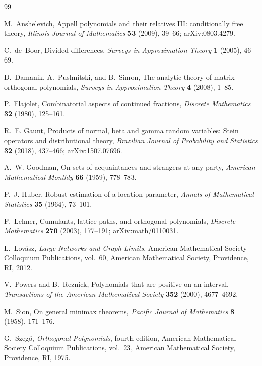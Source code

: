 ﻿\documentclass[11pt]{article}
\numberwithin{equation}{section}
\begin{document}
\begin{thebibliography}{99}

   M.~Anshelevich, \newblock Appell polynomials and their relatives III: conditionally free theory, \newblock \emph{Illinois Journal of Mathematics} \textbf{53} (2009), 39--66; \newblock arXiv:0803.4279.

   C.~de~Boor, \newblock Divided differences, \newblock \emph{Surveys in Approximation Theory} \textbf{1} (2005), 46--69.

   D.~Damanik, A.~Pushnitski, and B.~Simon, \newblock The analytic theory of matrix orthogonal polynomials, \newblock \emph{Surveys in Approximation Theory} \textbf{4} (2008), 1--85.

   P.~Flajolet, \newblock Combinatorial aspects of continued fractions, \newblock \emph{Discrete Mathematics} \textbf{32} (1980), 125--161.

   R.~E. Gaunt, \newblock Products of normal, beta and gamma random variables: Stein operators and distributional theory, \newblock \emph{Brazilian Journal of Probability and Statistics} \textbf{32} (2018), 437--466; \newblock arXiv:1507.07696.

   A.~W. Goodman, \newblock On sets of acquaintances and strangers at any party, \newblock \emph{American Mathematical Monthly} \textbf{66} (1959), 778--783.

   P.~J. Huber, \newblock Robust estimation of a location parameter, \newblock \emph{Annals of Mathematical Statistics} \textbf{35} (1964), 73--101.

   F.~Lehner, \newblock Cumulants, lattice paths, and orthogonal polynomials, \newblock \emph{Discrete Mathematics} \textbf{270} (2003), 177--191; \newblock arXiv:math/0110031.

   L.~Lov\'asz, \newblock \emph{Large Networks and Graph Limits}, \newblock American Mathematical Society Colloquium Publications, vol.~60, American Mathematical Society, Providence, RI, 2012.

   V.~Powers and B.~Reznick, \newblock Polynomials that are positive on an interval, \newblock \emph{Transactions of the American Mathematical Society} \textbf{352} (2000), 4677--4692.

   M.~Sion, \newblock On general minimax theorems, \newblock \emph{Pacific Journal of Mathematics} \textbf{8} (1958), 171--176.

   G.~Szeg\H{o}, \newblock \emph{Orthogonal Polynomials}, fourth edition, \newblock American Mathematical Society Colloquium Publications, vol.~23, American Mathematical Society, Providence, RI, 1975.

\end{thebibliography}
\end{document}
